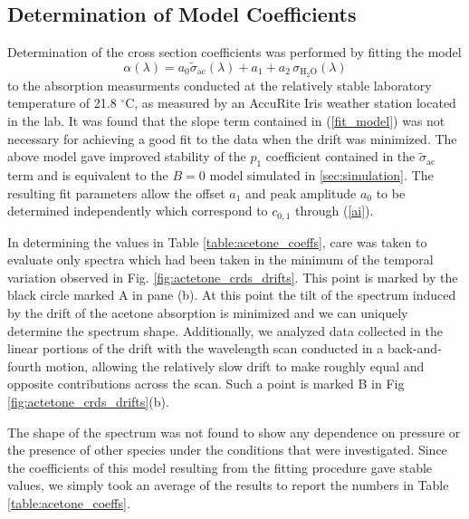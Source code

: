 \documentclass[12pt]{report}
\begin{document}
	
	\subsection{Determination of Model Coefficients} \label{sec:coeffs_acetone}
	
	Determination of the cross section coefficients was performed by fitting the model
	\begin{equation} \label{fit_model_coeff}
		\alpha(\lambda) = a_0\tilde{\sigma}_{\mathrm{ac}}(\lambda) + a_1 + a_2\,\sigma_\mathrm{H_2O}(\lambda)
	\end{equation}
	to the absorption measurments conducted at the relatively stable laboratory temperature of 21.8 $^\circ$C, as measured by an AccuRite Iris weather station located in the lab. It was found that the slope term contained in (\ref{fit_model}) was not necessary for achieving a good fit to the data when the drift was minimized. The above model gave improved stability of the $p_1$ coefficient contained in the $\tilde{\sigma}_{\mathrm{ac}}$ term and is equivalent to the $B=0$ model simulated in \ref{sec:simulation}. The resulting fit parameters allow the offset $a_1$ and peak amplitude $a_0$ to be determined independently which correspond to $c_{0,1}$ through (\ref{ai}).
	
	In determining the values in Table \ref{table:acetone_coeffs}, care was taken to evaluate only spectra which had been taken in the minimum of the temporal variation observed in Fig. \ref{fig:actetone_crds_drifts}. This point is marked by the black circle marked A in pane (b). At this point the tilt of the spectrum induced by the drift of the acetone absorption is minimized and we can uniquely determine the spectrum shape. Additionally, we analyzed data collected in the linear portions of the drift with the wavelength scan conducted in a back-and-fourth motion, allowing the relatively slow drift to make roughly equal and opposite contributions across the scan. Such a point is marked B in Fig \ref{fig:actetone_crds_drifts}(b).
	
	The shape of the spectrum was not found to show any dependence on pressure or the presence of other species under the conditions that were investigated. Since the coefficients of this model resulting from the fitting procedure gave stable values, we simply took an average of the results to report the numbers in Table \ref{table:acetone_coeffs}.
	
\end{document}

